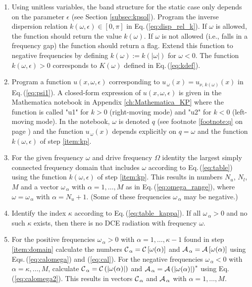 \begin{enumerate}

\item \label{item:kp} 
Using unitless variables,
the band structure for the static case only depends on the parameter $\epsilon$
(see Section \ref{subsec:kpsol}).
Program the inverse dispersion relation $k(\omega, \epsilon) \in [0, \pi]$ 
in Eq.\,(\ref{eq:disp_rel_k}). 
If $\omega$ is allowed, the function should return the value $k(\omega)$. If $\omega$ is not allowed 
(i.e., falls in a frequency gap) the function should return a flag.
Extend this function to negative frequencies by defining $k(\omega) := k(|\omega|)$ for $\omega < 0$.
The function $k(\omega, \epsilon) > 0$ corresponds to $K(\omega)$ defined in Eq.\,(\ref{eq:kdef}).

\item \label{item:u}
Program a function $u(x, \omega, \epsilon)$ corresponding to 
$u_{\,\omega}(x) = u_{\nu, \, k(\omega)}(x)$ in Eq.\,(\ref{eq:psi1}).
A closed-form expression of $u(x, \omega, \epsilon)$ is given in the Mathematica notebook in Appendix \ref{ch:Mathematica_KP}
%
where the function is called "u1" for $k>0$ (right-moving mode) and "u2" for $k<0$ (left-moving mode). 
In the notebook, $\omega$ is denoted $q$
(see footnote \ref{footnote:q} on page \pageref{footnote:q}) and the function 
$u_{\,\omega}(x)$ depends explicitly on $q = \omega$ and the function 
$k(\omega,\epsilon)$ of step \ref{item:kp}.
        
\item  \label{item:domain}
For the given frequency $\omega$ and drive frequency $\Omega$ identity the largest simply connected 
frequency domain that includes $\omega$ according to Eq.\,(\ref{eq:table}) using the function $k(\omega,\epsilon)$
of step \ref{item:kp}. This results in numbers
$N_u$, $N_l$, $M$ and a vector $\omega_{\,\alpha}$ with $\alpha = 1, \ldots, M$ as in 
Eq.\,(\ref{eq:omega_range}), where $\omega = \omega_{\,\alpha}$ with $\alpha = N_u + 1$.
(Some of these frequencies $\omega_{\,\alpha}$ may be negative.)

\item \label{item:kappa} 
Identify the index $\kappa$ according to Eq.\,(\ref{eq:table_kappa}). 
If all $\omega_{\,\alpha} > 0$ and no such $\kappa$ exists, then there is no DCE radiation with frequency $\omega$.

\item For the positive frequencies $\omega_{\,\alpha}>0$ with $\alpha = 1, \ldots, \kappa-1$
found in step \ref{item:domain} 
calculate the numbers ${\cal C}_{\,\alpha} = {\cal C}\left[\omega(\alpha)\right]$ and 
${\cal A}_{\,\alpha} = {\cal A}\left[\omega(\alpha)\right]$ using Eqs.\,(\ref{eq:calomega}) and (\ref{eq:cal}).
For the negative frequencies $\omega_{\,\alpha}<0$ with $\alpha = \kappa, \ldots, M$, 
calculate ${\cal C}_{\,\alpha} = {\cal C}\left(|\omega(\alpha)|\right)$ and
${\cal A}_{\,\alpha} = {\cal A}\left(|\omega(\alpha)|\right)^*$
using Eq.\,(\ref{eq:calomega2}).
This results in vectors ${\cal C}_{\,\alpha}$ and ${\cal A}_{\,\alpha}$ 
with $\alpha = 1, \ldots, M$.


\end{enumerate}
